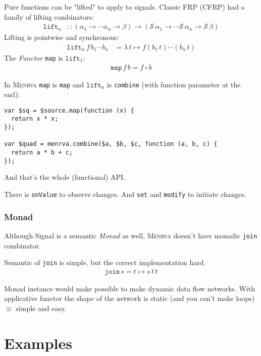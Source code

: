 \documentclass[10pt,fleqn]{article}
\theoremstyle{definition}
\theoremstyle{plain}
\begin{document}
Pure functions can be "lifted" to apply to signals. Classic FRP (CFRP) had a family of lifting combinators:
\begin{align*}
\texttt{lift}_n &:: (\alpha_1 \to \cdots \alpha_n \to \beta) \to (\mathcal{S}\,\alpha_1 \to \cdots \mathcal{S}\,\alpha_n \to \mathcal{S}\,\beta)
\end{align*}
Lifting is pointwise and synchronous:
\begin{align*}
\texttt{lift}_n\,f\,b_1\cdots b_n &= \lambda\,t \mapsto f (b_1\, t)\cdots (b_n\, t)
\end{align*}
The \emph{Functor} \texttt{map} is $\texttt{lift}_1$:
\begin{align*}
\texttt{map}\,f\,b = f \circ b
\end{align*}

\newpage

In \textsc{Menrva} \texttt{map} is \texttt{map} and $\texttt{lift}_n$ is \texttt{combine} (with function parameter at the end):
\begin{verbatim}
var $sq = $source.map(function (x) {
  return x * x;
});

var $quad = menrva.combine($a, $b, $c, function (a, b, c) {
  return a * b + c;
});
\end{verbatim}

And that's the whole (functional) API. 

{\small There is \texttt{onValue} to observe changes. And \texttt{set} and \texttt{modify} to initiate changes.}

\newpage

\subsubsection*{Monad}

Although Signal is a semantic \emph{Monad} as well, \textsc{Menrva} doesn't have monadic \texttt{join} combinator.

Semantic of \texttt{join} is simple, but the correct implementation hard.
\begin{align*}
\texttt{join}\,s = t \mapsto s\,t\,t
\end{align*}

Monad instance would make possible to make dynamic data flow networks. With applicative functor the shape of the network is static (and you can't make loops) $\equiv$ simple and easy.

\newpage

\section*{Examples}
\end{document}
